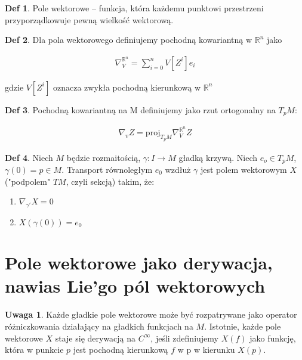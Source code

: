 \documentclass{article}
\theoremstyle{plain}
\theoremstyle{definition}
\newtheorem*{defi*}{Def}
\theoremstyle{definition}
\newtheorem*{not*}{Uwaga}
\begin{document}
\begin{defi*}
Pole wektorowe – funkcja, która każdemu punktowi przestrzeni przyporządkowuje pewną wielkość wektorową.
\end{defi*}

\begin{defi*}
Dla pola wektorowego definiujemy pochodną kowariantną w $\mathbb{R}^n$ jako

\begin{align*}
    \nabla_V^{\mathbb{R}^n} = \sum_{i=0}^n V[Z^i]e_i
\end{align*}

\noindent gdzie $V[Z^i]$ oznacza zwykła pochodną kierunkową w $\mathbb{R}^n$
\end{defi*}

\begin{defi*}
Pochodną kowariantną na M definiujemy jako rzut ortogonalny na $T_pM$:

\begin{align*}
    \nabla_v Z = \text{proj}_{T_pM} \nabla_V^{\mathbb{R}^n} Z
\end{align*}

\end{defi*}


\begin{defi*}
Niech $M$ będzie rozmaitością, $\gamma: I \to M$ gładką krzywą.
Niech $e_o \in T_pM$, $\gamma (0) = p \in M$. Transport równoległym $e_0$ wzdłuż $\gamma$ jest polem wektorowym $X$ ("podpolem" $TM$, czyli sekcją) takim, że:
\begin{enumerate}
    \item $\nabla_{\gamma'} X = 0$
    \item $X(\gamma(0)) = e_0$
\end{enumerate}

\end{defi*}

\section{Pole wektorowe jako derywacja, nawias Lie'go pól wektorowych}

\begin{not*}
Każde gładkie pole wektorowe może być rozpatrywane jako operator różniczkowania działający na gładkich funkcjach na $M$.
Istotnie, każde pole wektorowe $X$ staje się derywacją na $C^\infty$, jeśli zdefiniujemy $X(f)$ jako funkcję, która w punkcie $p$ jest pochodną kierunkową $f$ w p w kierunku $X(p)$.

\end{not*}
\end{document}
